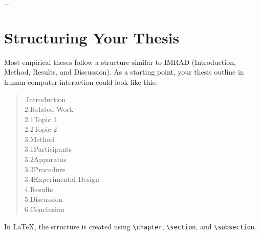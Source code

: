 \begin{listing}[H]
\begin{code}
\newcommand{\thesislang}{english}
\newcommand{\thesislevel}{master}
\newcommand{\thesistitle}{The Best Thesis}
...
\end{code}
\caption{Example configuration in config.tex}
\end{listing}


\section{Structuring Your Thesis}

Most empirical theses follow a structure similar to IMRAD (Introduction, Method, Results, and Discussion). As a starting point, your thesis outline in human-computer interaction could look like this:

\begin{quote}
.\quad Introduction\\
2.\quad Related Work\\
\hspace*{1.5em}2.1\quad Topic 1\\
\hspace*{1.5em}2.2\quad Topic 2\\
3.\quad Method\\
\hspace*{1.5em}3.1\quad Participants\\
\hspace*{1.5em}3.2\quad Apparatus\\
\hspace*{1.5em}3.3\quad Procedure\\
\hspace*{1.5em}3.4\quad Experimental Design\\
4.\quad Results\\
5.\quad Discussion\\
6.\quad Conclusion\\
\end{quote}

In \LaTeX, the structure is created using \texttt{\textbackslash chapter}, \texttt{\textbackslash section}, and \texttt{\textbackslash subsection}.

